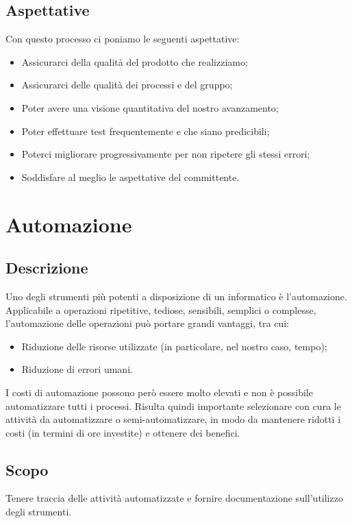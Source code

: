   \subsection{Aspettative}
  Con questo processo ci poniamo le seguenti aspettative:
  \begin{itemize}
      \item Assicurarci della qualità del prodotto che realizziamo;
      \item Assicurarci delle qualità dei processi e del gruppo;
      \item Poter avere una visione quantitativa del nostro avanzamento;
      \item Poter effettuare test frequentemente e che siano predicibili;
      \item Poterci migliorare progressivamente per non ripetere gli stessi errori;
      \item Soddisfare al meglio le aspettative del committente.
  \end{itemize}

\section{Automazione}
\subsection{Descrizione}
Uno degli strumenti più potenti a disposizione di un informatico è l'automazione. Applicabile a operazioni ripetitive, tediose, sensibili, semplici o complesse, l'automazione delle operazioni può portare grandi vantaggi, tra cui:
\begin{itemize}
    \item Riduzione delle risorse utilizzate (in particolare, nel nostro caso, tempo);
    \item Riduzione di errori umani.
\end{itemize}
I costi di automazione possono però essere molto elevati e non è possibile automatizzare tutti i processi. Risulta quindi importante selezionare con cura le attività da automatizzare o semi-automatizzare, in modo da mantenere ridotti i costi (in termini di ore investite) e ottenere dei benefici.

\subsection{Scopo}
Tenere traccia delle attività automatizzate e fornire documentazione sull'utilizzo degli strumenti.

